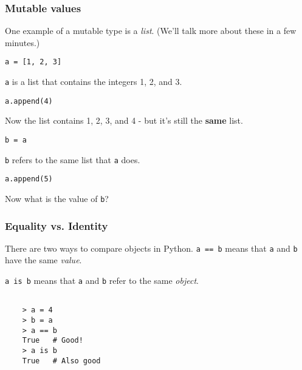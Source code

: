 \documentclass[10pt]{beamer}
\begin{document}
\begin{frame}
  \frametitle{Mutable values}
   
  One example of a mutable type is a \emph{list}. (We'll talk more about these in a few minutes.)

  \texttt{a = [1, 2, 3]}
  
  \texttt{a} is a list that contains the integers 1, 2, and 3.

  \texttt{a.append(4)}
  
  Now the list contains 1, 2, 3, and 4 - but it's still the \textbf{same} list. 
  
  \texttt{b = a}
  
  \texttt{b} refers to the same list that \texttt{a} does.
  
  \texttt{a.append(5)}
  
  Now what is the value of \texttt{b}?
  
  
  
\end{frame}

\begin{frame}[fragile]
  \frametitle{Equality vs. Identity}
   
   There are two ways to compare objects in Python.
   \vspace{5mm}
   \texttt{a == b} means that \texttt{a} and \texttt{b} have the same \emph{value}.
   
   \vspace{5mm}
   \texttt{a is b} means that \texttt{a} and \texttt{b} refer to the same \emph{object}.

  \vspace{5mm}
   \begin{verbatim}
   
    > a = 4
    > b = a
    > a == b
    True   # Good!
    > a is b
    True   # Also good
   
   
   \end{verbatim}
  
  
\end{frame}
\end{document}
